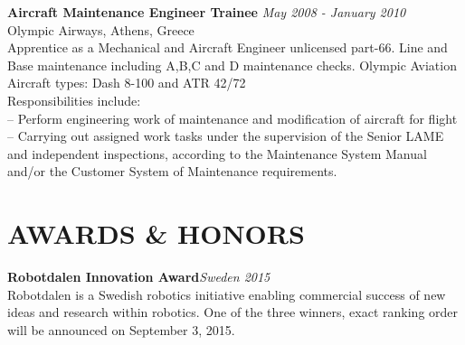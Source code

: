 \documentclass[11pt]{res} %
\begin{document}
\begin{resume}
\small\textbf{Aircraft Maintenance Engineer Trainee} \hfill {\sl May 2008 - January 2010} \\
Olympic Airways, Athens, Greece\\Apprentice as a Mechanical and Aircraft Engineer unlicensed part-66. Line and Base maintenance including A,B,C and D maintenance checks. Olympic Aviation Aircraft types: Dash 8-100 and ATR 42/72\\
Responsibilities include:\\
-- Perform engineering work of maintenance and modification of aircraft for flight\\
-- Carrying out assigned work tasks under the supervision of the Senior LAME %
 and independent inspections, according to the Maintenance System Manual and/or the Customer System of Maintenance requirements.

\vspace{0.2in} %




\section{AWARDS \& HONORS} 
\vspace{8pt} %
\small \textbf  {Robotdalen Innovation Award}\hfill {\sl Sweden 2015}\\
Robotdalen is a Swedish robotics initiative enabling commercial success of new ideas and research within robotics. One of the three winners, exact ranking order will be announced on September 3, 2015.

\vspace{0.2in} %





\end{resume}
\end{document}
